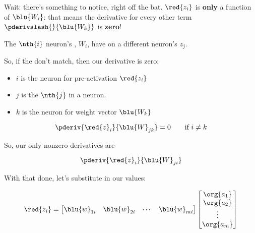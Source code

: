         Wait: there's something to notice, right off the bat. $\red{z_i}$ is \textbf{only} a function of $\blu{W_i}$: that means the derivative for every other term $\pderivslash{}{\blu{W_k}}$ is \textbf{zero}!
            \\
        
        \begin{concept}
            The $\nth{i}$ neuron's , $W_i$, have  on a different neuron's  $z_j$.
            
            So, if the  don't match, then our derivative is zero:
            
            \begin{itemize}
                \item $i$ is the neuron for pre-activation $\red{z_i}$
                \item $j$ is the $\nth{j}$  in a neuron.
                \item $k$ is the neuron for weight vector $\blu{W_k}$
            \end{itemize}
            
            \begin{equation*}
                \pderiv{ \red{z}_i }{ \blu{W}_{jk} } = 0 
                \qquad
                \text{if } i \neq k
            \end{equation*}
            
            So, our only nonzero derivatives are
            
            \begin{equation*}
                \pderiv{ \red{z}_i }{ \blu{W}_{ji} }
            \end{equation*}
        \end{concept}
        
        \subsecdiv
        
        With that done, let's substitute in our values:
        
        \begin{equation}
            \red{z_i} 
            =
            \begin{bmatrix}
                \blu{w}_{1i} & \blu{w}_{2i} & \cdots & \blu{w}_{mi}
            \end{bmatrix}
            \begin{bmatrix}
                \org{a_1}\\\org{a_2}\\ \vdots \\ \org{a_m}
            \end{bmatrix}
        \end{equation}
        
